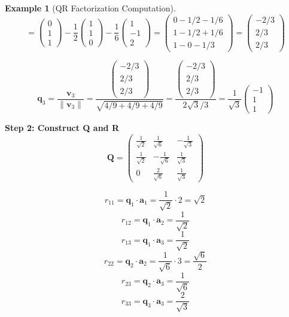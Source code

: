 \documentclass[12pt]{article}
\numberwithin{equation}{section}
\newcommand{\vect}[1]{\boldsymbol{#1}}   %
\newcommand{\mat}[1]{\mathbf{#1}}        %
\theoremstyle{plain}
\theoremstyle{definition}
\newtheorem{example}[theorem]{Example}
\theoremstyle{remark}
\begin{document}
\begin{example}[QR Factorization Computation]
$$= \begin{pmatrix} 0 \\ 1 \\ 1 \end{pmatrix} - \frac{1}{2}\begin{pmatrix} 1 \\ 1 \\ 0 \end{pmatrix} - \frac{1}{6}\begin{pmatrix} 1 \\ -1 \\ 2 \end{pmatrix} = \begin{pmatrix} 0 - 1/2 - 1/6 \\ 1 - 1/2 + 1/6 \\ 1 - 0 - 1/3 \end{pmatrix} = \begin{pmatrix} -2/3 \\ 2/3 \\ 2/3 \end{pmatrix}$$

$$\vect{q}_3 = \frac{\vect{v}_3}{\|\vect{v}_3\|} = \frac{\begin{pmatrix} -2/3 \\ 2/3 \\ 2/3 \end{pmatrix}}{\sqrt{4/9 + 4/9 + 4/9}} = \frac{\begin{pmatrix} -2/3 \\ 2/3 \\ 2/3 \end{pmatrix}}{2\sqrt{3}/3} = \frac{1}{\sqrt{3}}\begin{pmatrix} -1 \\ 1 \\ 1 \end{pmatrix}$$

\textbf{Step 2: Construct Q and R}
$$\mat{Q} = \begin{pmatrix} \frac{1}{\sqrt{2}} & \frac{1}{\sqrt{6}} & -\frac{1}{\sqrt{3}} \\ \frac{1}{\sqrt{2}} & -\frac{1}{\sqrt{6}} & \frac{1}{\sqrt{3}} \\ 0 & \frac{2}{\sqrt{6}} & \frac{1}{\sqrt{3}} \end{pmatrix}$$

$$r_{11} = \vect{q}_1 \cdot \vect{a}_1 = \frac{1}{\sqrt{2}} \cdot 2 = \sqrt{2}$$
$$r_{12} = \vect{q}_1 \cdot \vect{a}_2 = \frac{1}{\sqrt{2}}$$
$$r_{13} = \vect{q}_1 \cdot \vect{a}_3 = \frac{1}{\sqrt{2}}$$
$$r_{22} = \vect{q}_2 \cdot \vect{a}_2 = \frac{1}{\sqrt{6}} \cdot 3 = \frac{\sqrt{6}}{2}$$
$$r_{23} = \vect{q}_2 \cdot \vect{a}_3 = \frac{1}{\sqrt{6}}$$
$$r_{33} = \vect{q}_3 \cdot \vect{a}_3 = \frac{2}{\sqrt{3}}$$


\end{example}
\end{document}
